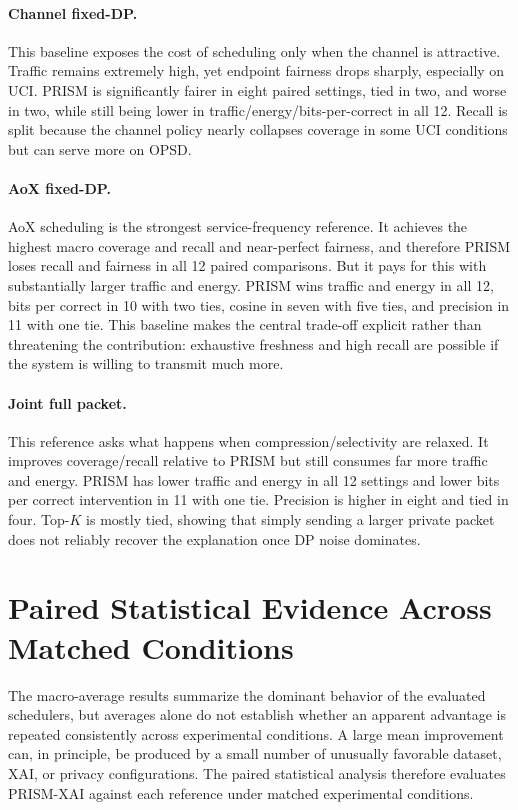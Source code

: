 \documentclass[11pt]{article}
\begin{document}
\paragraph{Channel fixed-DP.} This baseline exposes the cost of scheduling only when the channel is attractive. Traffic remains extremely high, yet endpoint fairness drops sharply, especially on UCI. PRISM is significantly fairer in eight paired settings, tied in two, and worse in two, while still being lower in traffic/energy/bits-per-correct in all 12. Recall is split because the channel policy nearly collapses coverage in some UCI conditions but can serve more on OPSD.

\paragraph{AoX fixed-DP.} AoX scheduling is the strongest service-frequency reference. It achieves the highest macro coverage and recall and near-perfect fairness, and therefore PRISM loses recall and fairness in all 12 paired comparisons. But it pays for this with substantially larger traffic and energy. PRISM wins traffic and energy in all 12, bits per correct in 10 with two ties, cosine in seven with five ties, and precision in 11 with one tie. This baseline makes the central trade-off explicit rather than threatening the contribution: exhaustive freshness and high recall are possible if the system is willing to transmit much more.

\paragraph{Joint full packet.} This reference asks what happens when compression/selectivity are relaxed. It improves coverage/recall relative to PRISM but still consumes far more traffic and energy. PRISM has lower traffic and energy in all 12 settings and lower bits per correct intervention in 11 with one tie. Precision is higher in eight and tied in four. Top-$K$ is mostly tied, showing that simply sending a larger private packet does not reliably recover the explanation once DP noise dominates.

\section{Paired Statistical Evidence Across Matched Conditions}

The macro-average results summarize the dominant behavior of the evaluated schedulers, but averages alone do not establish whether an apparent advantage is repeated consistently across experimental conditions. A large mean improvement can, in principle, be produced by a small number of unusually favorable dataset, XAI, or privacy configurations. The paired statistical analysis therefore evaluates PRISM-XAI against each reference under matched experimental conditions.
\end{document}
